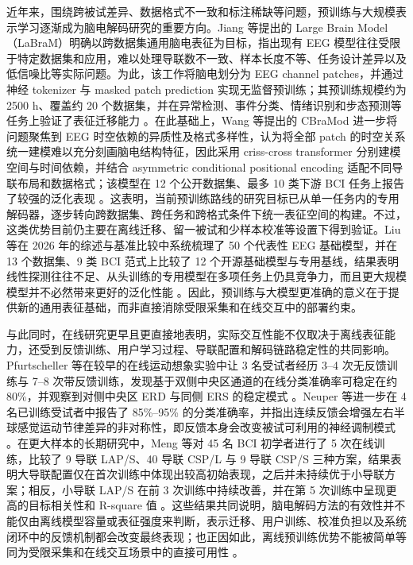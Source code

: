 近年来，围绕跨被试差异、数据格式不一致和标注稀缺等问题，预训练与大规模表示学习逐渐成为脑电解码研究的重要方向。Jiang 等提出的 Large Brain Model（LaBraM）明确以跨数据集通用脑电表征为目标，指出现有 EEG 模型往往受限于特定数据集和应用，难以处理导联数不一致、样本长度不等、任务设计差异以及低信噪比等实际问题。为此，该工作将脑电划分为 EEG channel patches，并通过神经 tokenizer 与 masked patch prediction 实现无监督预训练；其预训练规模约为 2500 h、覆盖约 20 个数据集，并在异常检测、事件分类、情绪识别和步态预测等任务上验证了表征迁移能力 \cite{Jia24}。在此基础上，Wang 等提出的 CBraMod 进一步将问题聚焦到 EEG 时空依赖的异质性及格式多样性，认为将全部 patch 的时空关系统一建模难以充分刻画脑电结构特征，因此采用 criss-cross transformer 分别建模空间与时间依赖，并结合 asymmetric conditional positional encoding 适配不同导联布局和数据格式；该模型在 12 个公开数据集、最多 10 类下游 BCI 任务上报告了较强的泛化表现 \cite{Wan24b}。这表明，当前预训练路线的研究目标已从单一任务内的专用解码器，逐步转向跨数据集、跨任务和跨格式条件下统一表征空间的构建。不过，这类优势目前仍主要在离线迁移、留一被试和少样本校准等设置下得到验证。Liu 等在 2026 年的综述与基准比较中系统梳理了 50 个代表性 EEG 基础模型，并在 13 个数据集、9 类 BCI 范式上比较了 12 个开源基础模型与专用基线，结果表明线性探测往往不足、从头训练的专用模型在多项任务上仍具竞争力，而且更大规模模型并不必然带来更好的泛化性能 \cite{Liu26b}。因此，预训练与大模型更准确的意义在于提供新的通用表征基础，而非直接消除受限采集和在线交互中的部署约束。

与此同时，在线研究更早且更直接地表明，实际交互性能不仅取决于离线表征能力，还受到反馈训练、用户学习过程、导联配置和解码链路稳定性的共同影响。Pfurtscheller 等在较早的在线运动想象实验中让 3 名受试者经历 3--4 次无反馈训练与 7--8 次带反馈训练，发现基于双侧中央区通道的在线分类准确率可稳定在约 80\%，并观察到对侧中央区 ERD 与同侧 ERS 的稳定模式 \cite{Pfu97}。Neuper 等进一步在 4 名已训练受试者中报告了 85\%--95\% 的分类准确率，并指出连续反馈会增强左右半球感觉运动节律差异的非对称性，即反馈本身会改变被试可利用的神经调制模式 \cite{Neu99}。在更大样本的长期研究中，Meng 等对 45 名 BCI 初学者进行了 5 次在线训练，比较了 9 导联 LAP/S、40 导联 CSP/L 与 9 导联 CSP/S 三种方案，结果表明大导联配置仅在首次训练中体现出较高初始表现，之后并未持续优于小导联方案；相反，小导联 LAP/S 在前 3 次训练中持续改善，并在第 5 次训练中呈现更高的目标相关性和 R-square 值 \cite{Men18}。这些结果共同说明，脑电解码方法的有效性并不能仅由离线模型容量或表征强度来判断，表示迁移、用户训练、校准负担以及系统闭环中的反馈机制都会改变最终表现；也正因如此，离线预训练优势不能被简单等同为受限采集和在线交互场景中的直接可用性 \cite{Liu26b}。

